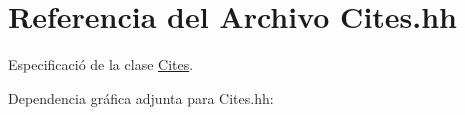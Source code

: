 \hypertarget{_cites_8hh}{}\section{Referencia del Archivo Cites.\+hh}
\label{_cites_8hh}


Especificació de la clase \hyperlink{class_cites}{Cites}.  


Dependencia gráfica adjunta para Cites.\+hh\+:
